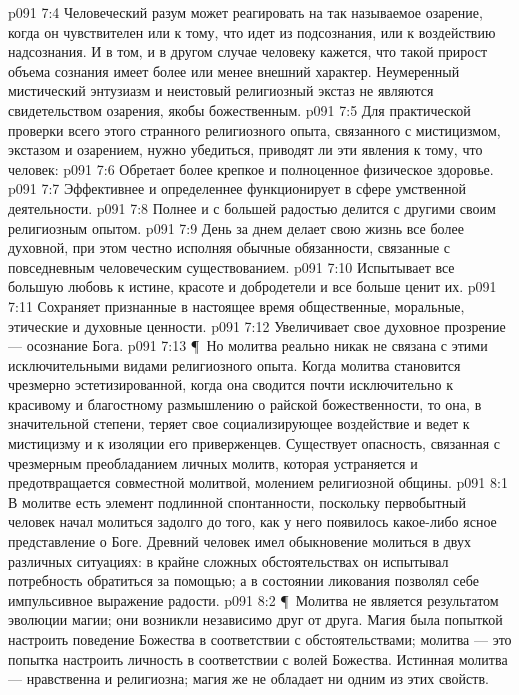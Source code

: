 \vs p091 7:4 Человеческий разум может реагировать на так называемое озарение, когда он чувствителен или к тому, что идет из подсознания, или к воздействию надсознания. И в том, и в другом случае человеку кажется, что такой прирост объема сознания имеет более или менее внешний характер. Неумеренный мистический энтузиазм и неистовый религиозный экстаз не являются свидетельством озарения, якобы божественным.
\vs p091 7:5 Для практической проверки всего этого странного религиозного опыта, связанного с мистицизмом, экстазом и озарением, нужно убедиться, приводят ли эти явления к тому, что человек:
\vs p091 7:6 \bibnobreakspace Обретает более крепкое и полноценное физическое здоровье.
\vs p091 7:7 \bibnobreakspace Эффективнее и определеннее функционирует в сфере умственной деятельности.
\vs p091 7:8 \bibnobreakspace Полнее и с большей радостью делится с другими своим религиозным опытом.
\vs p091 7:9 \bibnobreakspace День за днем делает свою жизнь все более духовной, при этом честно исполняя обычные обязанности, связанные с повседневным человеческим существованием.
\vs p091 7:10 \bibnobreakspace Испытывает все большую любовь к истине, красоте и добродетели и все больше ценит их.
\vs p091 7:11 \bibnobreakspace Сохраняет признанные в настоящее время общественные, моральные, этические и духовные ценности.
\vs p091 7:12 \bibnobreakspace Увеличивает свое духовное прозрение --- осознание Бога.
\vs p091 7:13 \P\ Но молитва реально никак не связана с этими исключительными видами религиозного опыта. Когда молитва становится чрезмерно эстетизированной, когда она сводится почти исключительно к красивому и благостному размышлению о райской божественности, то она, в значительной степени, теряет свое социализирующее воздействие и ведет к мистицизму и к изоляции его приверженцев. Существует опасность, связанная с чрезмерным преобладанием личных молитв, которая устраняется и предотвращается совместной молитвой, молением религиозной общины.
\vs p091 8:1 В молитве есть элемент подлинной спонтанности, поскольку первобытный человек начал молиться задолго до того, как у него появилось какое\hyp{}либо ясное представление о Боге. Древний человек имел обыкновение молиться в двух различных ситуациях: в крайне сложных обстоятельствах он испытывал потребность обратиться за помощью; а в состоянии ликования позволял себе импульсивное выражение радости.
\vs p091 8:2 \P\ Молитва не является результатом эволюции магии; они возникли независимо друг от друга. Магия была попыткой настроить поведение Божества в соответствии с обстоятельствами; молитва --- это попытка настроить личность в соответствии с волей Божества. Истинная молитва --- нравственна и религиозна; магия же не обладает ни одним из этих свойств.
